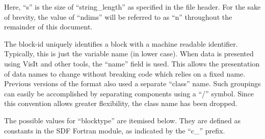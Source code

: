 \documentclass[12pt]{article}
\begin{document}
Here, ``s'' is the size of ``string\_length'' as specified in the file header.
For the sake of brevity, the value of ``ndims'' will be referred to as ``n''
throughout the remainder of this document.

The block-id uniquely identifies a block with a machine readable identifier.
Typically, this is just the variable name (in lower case). When data is
presented using VisIt and other tools, the ``name'' field is used. This
allows the presentation of data names to change without breaking code which
relies on a fixed name. Previous versions of the format also used a separate
``class'' name. Such groupings can easily be accomplished by separating
components using a ``/'' symbol. Since this convention allows greater
flexibility, the class name has been dropped.

The possible values for ``blocktype'' are itemised below. They are defined
as constants in the SDF Fortran module, as indicated by the ``c\_'' prefix.\\
\end{document}
